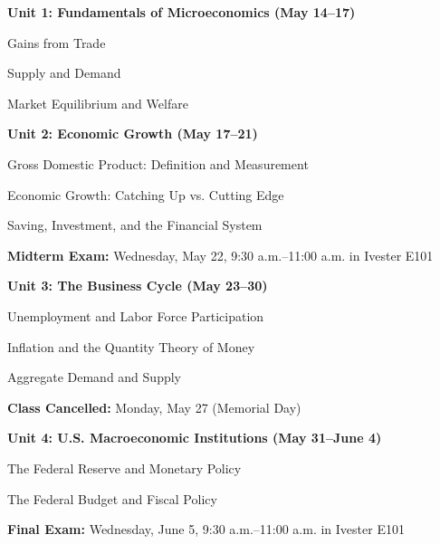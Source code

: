 \textbf{Unit 1: Fundamentals of Microeconomics (May 14--17)}
\begin{ul}
    \item Gains from Trade
    \item Supply and Demand
    \item Market Equilibrium and Welfare
\end{ul}

\textbf{Unit 2: Economic Growth (May 17--21)}
\begin{ul}
    \item Gross Domestic Product: Definition and Measurement
    \item Economic Growth: Catching Up vs. Cutting Edge
    \item Saving, Investment, and the Financial System
\end{ul}

\textbf{Midterm Exam:} Wednesday, May 22, 9:30 a.m.--11:00 a.m. in Ivester E101

\textbf{Unit 3: The Business Cycle (May 23--30)}
\begin{ul}
    \item Unemployment and Labor Force Participation
    \item Inflation and the Quantity Theory of Money
    \item Aggregate Demand and Supply
\end{ul}

\textbf{Class Cancelled:} Monday, May 27 (Memorial Day)

\textbf{Unit 4: U.S. Macroeconomic Institutions (May 31--June 4)}
\begin{ul}
    \item The Federal Reserve and Monetary Policy
    \item The Federal Budget and Fiscal Policy
\end{ul}

\textbf{Final Exam:} Wednesday, June 5, 9:30 a.m.--11:00 a.m. in Ivester E101
